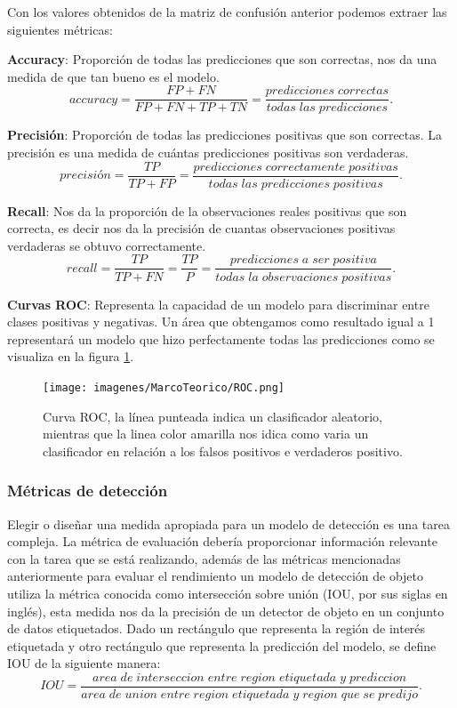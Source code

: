 Con los valores obtenidos de la matriz de confusión anterior podemos extraer las siguientes métricas:

\textbf{Accuracy}: Proporción de todas las predicciones que son correctas, nos da una medida de que tan bueno es el modelo.
\begin{equation}
accuracy = \frac{FP+FN}{FP+FN+TP+TN}=\frac{predicciones\;correctas}{todas\;las\;predicciones}.
\end{equation}

\textbf{Precisión}: Proporción de todas las predicciones positivas que son correctas. La precisión es una medida de cuántas predicciones positivas son verdaderas.
\begin{equation}
precisión=\frac{TP}{TP+FP}= \frac{predicciones\;correctamente\;positivas}{todas\;las\;predicciones\;positivas}.
\end{equation}

\textbf{Recall}: Nos da la proporción de la observaciones reales positivas que son correcta, es decir nos da la precisión de cuantas observaciones positivas verdaderas se obtuvo correctamente.
\begin{equation}
recall = \frac{TP}{TP+FN} = \frac{TP}{P} = \frac{predicciones\;a\;ser\;positiva}{todas\;la\;observaciones\;positivas} .
\end{equation}

\textbf{Curvas ROC}: Representa la capacidad de un modelo para discriminar entre clases positivas y negativas. Un área que obtengamos  como resultado igual a 1 representará un modelo que hizo perfectamente todas las predicciones como se visualiza en la figura \ref{Fig: roc}.
\begin{figure}[H]
 \centering
  \texttt{[image: imagenes/MarcoTeorico/ROC.png]}
  \caption{Curva ROC, la línea punteada indica un clasificador aleatorio, mientras que la linea color amarilla nos idica como varia un clasificador en relación a los falsos positivos e verdaderos positivo.} \label{Fig: roc}
\end{figure}

\subsubsection*{Métricas de detección}\label{sub:metricas_de_deteccion}
Elegir o diseñar una medida apropiada para un modelo de detección es una tarea compleja. La métrica de evaluación debería proporcionar información relevante con la tarea que se está realizando, además de las métricas mencionadas anteriormente para evaluar el rendimiento un modelo de detección de objeto utiliza la métrica conocida como intersección sobre unión (IOU, por sus siglas en inglés), esta medida nos da la precisión de un detector de objeto en un conjunto de datos etiquetados. Dado un rectángulo que representa la región de interés etiquetada y otro rectángulo que representa la predicción del modelo, se define IOU de la siguiente manera:
\begin{equation}
IOU = \frac{area\;de\;interseccion\;entre\;region\;etiquetada\;y\;prediccion}{area\;de\;union\;entre\;region\;etiquetada\;y\;region\;que\;se\;predijo}.
\end{equation}

